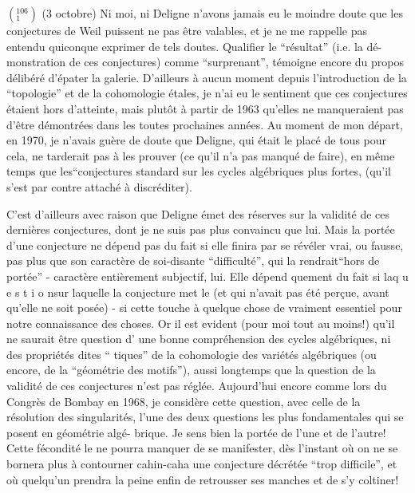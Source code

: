 $({}^{106}_{1})$ (3 octobre) Ni moi, ni Deligne n'avons jamais eu le moindre doute que les
conjectures de Weil puissent ne pas être valables, et je ne me rappelle pas 
entendu quiconque exprimer de tels doutes. Qualifier le ``résultat'' (i.e. la dé-\newline
monstration de ces conjectures) comme ``surprenant'', témoigne encore du propos
délibéré d'épater la galerie. D'ailleurs à aucun moment depuis l'introduction
de la ``topologie'' et de la cohomologie étales, je n'ai eu le sentiment que ces
conjectures étaient hors d'atteinte, mais plutôt \inserted{(}à partir de 1963\inserted{)} qu'elles ne
manqueraient pas d'être démontrées dans les toutes prochaines années. Au moment
de mon départ, en 1970, je n'avais guère de doute que Deligne, qui était le 
placé de tous pour cela, ne tarderait pas à les prouver (ce qu'il n'a pas manqué
de faire), en même temps que les``conjectures standard sur les cycles algébriques
plus fortes, (qu'il s'est par contre attaché à discréditer).

C'est d'ailleurs avec raison que Deligne émet des réserves sur la validité
de ces dernières conjectures, dont je ne suis pas plus convaincu que lui. Mais
la portée d'une conjecture ne dépend pas du fait si elle finira par se révéler
vrai, ou fausse, pas plus que son caractère de soi-disante ``difficulté'', qui la
rendrait``hors de portée'' - caractère entièrement subjectif, lui. Elle dépend \newline
quement du fait si la\quad q u e s t i o n\quad sur laquelle la conjecture met le 
(et qui n'avait pas été perçue, avant qu'elle ne soit posée) - si cette 
touche à quelque chose de vraiment essentiel pour notre connaissance des choses.
Or il est evident (pour moi tout au moins!) qu'il ne saurait être question d'
une bonne compréhension des cycles algébriques, ni des propriétés dites ``\newline
tiques'' de la cohomologie des variétés algébriques (ou encore, de la ``géométrie
des motifs''), aussi longtemps que la question de la validité de ces conjectures
n'est pas réglée. Aujourd'hui encore comme lors du Congrès de Bombay en 1968,
je considère cette question, avec celle de la résolution des singularités, 
l'une des deux questions les plus fondamentales qui se posent en géométrie algé-\newline
brique. Je sens bien la portée de l'une et de l'autre! Cette fécondité \newline
le ne pourra manquer de se manifester, dès l'instant où on ne se bornera plus à
contourner cahin-caha une conjecture décrétée ``trop difficile'', et où quelqu'un
prendra la peine enfin de retrousser ses manches et de s'y coltiner!
